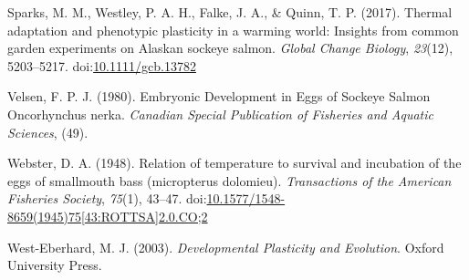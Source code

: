 \documentclass[10pt,a4paper,onecolumn]{article}
\newlength{\cslhangindent}
\newenvironment{CSLReferences}[2] %
 {\begin{list}{}{%
  \setlength{\itemindent}{0pt}
  \setlength{\leftmargin}{0pt}
  \setlength{\parsep}{0pt}
  \ifodd #1
   \setlength{\leftmargin}{\cslhangindent}
   \setlength{\itemindent}{-1\cslhangindent}
  \fi
  \setlength{\itemsep}{#2\baselineskip}}}
 {\end{list}}
\begin{document}
\begin{CSLReferences}{1}{0}
Sparks, M. M., Westley, P. A. H., Falke, J. A., \& Quinn, T. P. (2017).
Thermal adaptation and phenotypic plasticity in a warming world:
Insights from common garden experiments on Alaskan sockeye salmon.
\emph{Global Change Biology}, \emph{23}(12), 5203--5217.
doi:\href{https://doi.org/10.1111/gcb.13782}{10.1111/gcb.13782}

Velsen, F. P. J. (1980). Embryonic Development in Eggs of Sockeye Salmon
Oncorhynchus nerka. \emph{Canadian Special Publication of Fisheries and
Aquatic Sciences}, (49).

Webster, D. A. (1948). Relation of temperature to survival and
incubation of the eggs of smallmouth bass (micropterus dolomieu).
\emph{Transactions of the American Fisheries Society}, \emph{75}(1),
43--47.
doi:\href{https://doi.org/10.1577/1548-8659(1945)75\%5B43:ROTTSA\%5D2.0.CO;2}{10.1577/1548-8659(1945)75{[}43:ROTTSA{]}2.0.CO;2}

West-Eberhard, M. J. (2003). \emph{Developmental Plasticity and
Evolution}. Oxford University Press.

\end{CSLReferences}
\end{document}
